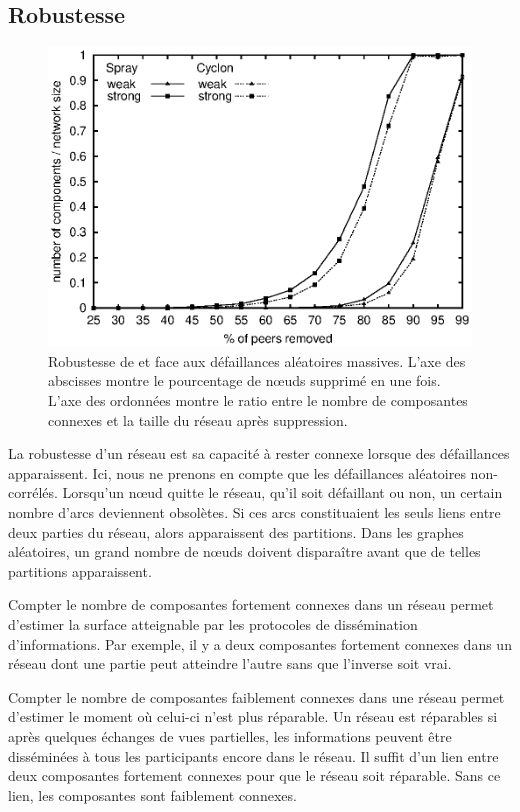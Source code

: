\subsection{Robustesse}
\label{net:subsec:robustness}

\begin{figure}
  \centering
  \includegraphics[width=.8\textwidth]{img/spray/resilience.eps}
  \caption[Robustesse aux pannes aléatoires] {\label{net:fig:robustness}
    Robustesse de \CYCLON et \SPRAY face aux défaillances aléatoires
    massives. L'axe des abscisses montre le pourcentage de nœuds supprimé en une
    fois. L'axe des ordonnées montre le ratio entre le nombre de composantes
    connexes et la taille du réseau après suppression.}
\end{figure}

La robustesse d'un réseau est sa capacité à rester connexe lorsque des
défaillances apparaissent. Ici, nous ne prenons en compte que les défaillances
aléatoires non-corrélés. Lorsqu'un nœud quitte le réseau, qu'il soit défaillant
ou non, un certain nombre d'arcs deviennent obsolètes. Si ces arcs constituaient
les seuls liens entre deux parties du réseau, alors apparaissent des partitions.
Dans les graphes aléatoires, un grand nombre de nœuds doivent disparaître avant
que de telles partitions apparaissent.

Compter le nombre de composantes fortement connexes dans un réseau permet
d'estimer la surface atteignable par les protocoles de dissémination
d'informations. Par exemple, il y a deux composantes fortement connexes dans un
réseau dont une partie peut atteindre l'autre sans que l'inverse soit
vrai.

Compter le nombre de composantes faiblement connexes dans une réseau permet
d'estimer le moment où celui-ci n'est plus réparable. Un réseau est réparables
si après quelques échanges de vues partielles, les informations peuvent être
disséminées à tous les participants encore dans le réseau. Il suffit d'un lien
entre deux composantes fortement connexes pour que le réseau soit
réparable. Sans ce lien, les composantes sont faiblement connexes.

